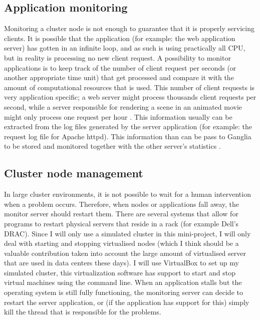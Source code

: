 \documentclass[12pt]{report}
\begin{document}
\subsection{Application monitoring}
Monitoring a cluster node is not enough to guarantee that it is
properly servicing clients. It is possible that the application (for
example: the web application server) has gotten in an infinite loop,
and as such is using practically all CPU, but in reality is
processing no new client request.
A possibility to monitor applications is to keep track of the number of
client request per seconds (or another appropriate time unit) that get
processed and compare it with the amount of computational resources
that is used.
This number of client requests is very application specific; a web
server might process thousands client requests per second, while a
server responsible for rendering a scene in an animated movie might only process
one request per hour \cite{apm:2013}.
This information usually can be extracted from the log files generated
by the server application (for example: the request log file for
Apache httpd). This information than can be pass to Ganglia to be
stored and monitored together with the other server's statistics
\cite{ganglia:2013}.

\subsection{Cluster node management}
In large cluster environments, it is not possible to wait for
a human intervention when a problem occurs. Therefore, when nodes or
applications fall away, the monitor server should restart them.
There are several systems that allow for programs to restart
physical servers that reside in a rack (for example Dell's DRAC).
Since I will only use a simulated cluster in this mini-project, I will
only deal with starting and stopping virtualised nodes (which I think should
be a valuable contribution taken into account the large amount of
virtualised server that are used in data centers these days).
I will use VirtualBox to set up my simulated cluster, this
virtualization software has support to start and stop virtual machines
using the command line.
When an application stalls but the operating system is still fully
functioning, the monitoring server can decide to restart the server application, or
(if the application has support for this) simply kill the thread that
is responsible for the problems.
\end{document}
